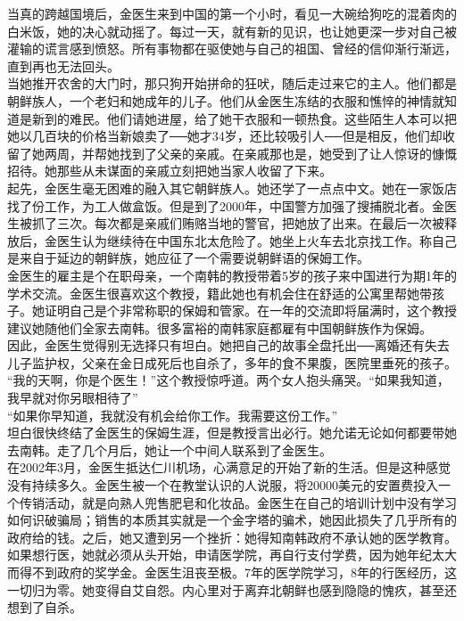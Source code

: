当真的跨越国境后，金医生来到中国的第一个小时，看见一大碗给狗吃的混着肉的白米饭，她的决心就动摇了。每过一天，就有新的见识，也让她更深一步对自己被灌输的谎言感到愤怒。所有事物都在驱使她与自己的祖国、曾经的信仰渐行渐远，直到再也无法回头。\\

当她推开农舍的大门时，那只狗开始拼命的狂吠，随后走过来它的主人。他们都是朝鲜族人，一个老妇和她成年的儿子。他们从金医生冻结的衣服和憔悴的神情就知道是新到的难民。他们请她进屋，给了她干衣服和一顿热食。这些陌生人本可以把她以几百块的价格当新娘卖了──她才34岁，还比较吸引人──但是相反，他们却收留了她两周，并帮她找到了父亲的亲戚。在亲戚那也是，她受到了让人惊讶的慷慨招待。她那些从未谋面的亲戚立刻把她当家人收留了下来。\\

起先，金医生毫无困难的融入其它朝鲜族人。她还学了一点点中文。她在一家饭店找了份工作，为工人做盒饭。但是到了2000年，中国警方加强了搜捕脱北者。金医生被抓了三次。每次都是亲戚们贿赂当地的警官，把她放了出来。在最后一次被释放后，金医生认为继续待在中国东北太危险了。她坐上火车去北京找工作。称自己是来自于延边的朝鲜族，她应征了一个需要说朝鲜语的保姆工作。\\

金医生的雇主是个在职母亲，一个南韩的教授带着5岁的孩子来中国进行为期1年的学术交流。金医生很喜欢这个教授，籍此她也有机会住在舒适的公寓里帮她带孩子。她证明自己是个非常称职的保姆和管家。在一年的交流即将届满时，这个教授建议她随他们全家去南韩。很多富裕的南韩家庭都雇有中国朝鲜族作为保姆。\\

因此，金医生觉得别无选择只有坦白。她把自己的故事全盘托出──离婚还有失去儿子监护权，父亲在金日成死后也自杀了，多年的食不果腹，医院里垂死的孩子。\\

“我的天啊，你是个医生！”这个教授惊呼道。两个女人抱头痛哭。“如果我知道，我早就对你另眼相待了”\\

“如果你早知道，我就没有机会给你工作。我需要这份工作。”\\

坦白很快终结了金医生的保姆生涯，但是教授言出必行。她允诺无论如何都要带她去南韩。走了几个月后，她让一个中间人联系到了金医生。\\

在2002年3月，金医生抵达仁川机场，心满意足的开始了新的生活。但是这种感觉没有持续多久。金医生被一个在教堂认识的人说服，将20000美元的安置费投入一个传销活动，就是向熟人兜售肥皂和化妆品。金医生在自己的培训计划中没有学习如何识破骗局；销售的本质其实就是一个金字塔的骗术，她因此损失了几乎所有的政府给的钱。之后，她又遭到另一个挫折：她得知南韩政府不承认她的医学教育。如果想行医，她就必须从头开始，申请医学院，再自行支付学费，因为她年纪太大而得不到政府的奖学金。金医生沮丧至极。7年的医学院学习，8年的行医经历，这一切归为零。她变得自艾自怨。内心里对于离弃北朝鲜也感到隐隐的愧疚，甚至还想到了自杀。\\

